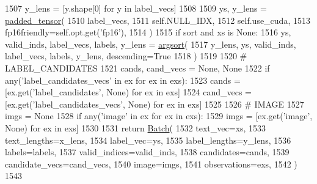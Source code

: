 \begin{DoxyCode}
1507             y\_lens = [y.shape[0] \textcolor{keywordflow}{for} y \textcolor{keywordflow}{in} label\_vecs]
1508 
1509             ys, y\_lens = \hyperlink{namespaceparlai_1_1agents_1_1legacy__agents_1_1seq2seq_1_1utils__v1_adb5a414ae439f14c54e8c760b91cc4c8}{padded\_tensor}(
1510                 label\_vecs,
1511                 self.NULL\_IDX,
1512                 self.use\_cuda,
1513                 fp16friendly=self.opt.get(\textcolor{stringliteral}{'fp16'}),
1514             )
1515             \textcolor{keywordflow}{if} sort \textcolor{keywordflow}{and} xs \textcolor{keywordflow}{is} \textcolor{keywordtype}{None}:
1516                 ys, valid\_inds, label\_vecs, labels, y\_lens = \hyperlink{namespaceparlai_1_1agents_1_1legacy__agents_1_1seq2seq_1_1utils__v1_a1521e559b740f741ebb47b8755202bb2}{argsort}(
1517                     y\_lens, ys, valid\_inds, label\_vecs, labels, y\_lens, descending=\textcolor{keyword}{True}
1518                 )
1519 
1520         \textcolor{comment}{# LABEL\_CANDIDATES}
1521         cands, cand\_vecs = \textcolor{keywordtype}{None}, \textcolor{keywordtype}{None}
1522         \textcolor{keywordflow}{if} any(\textcolor{stringliteral}{'label\_candidates\_vecs'} \textcolor{keywordflow}{in} ex \textcolor{keywordflow}{for} ex \textcolor{keywordflow}{in} exs):
1523             cands = [ex.get(\textcolor{stringliteral}{'label\_candidates'}, \textcolor{keywordtype}{None}) \textcolor{keywordflow}{for} ex \textcolor{keywordflow}{in} exs]
1524             cand\_vecs = [ex.get(\textcolor{stringliteral}{'label\_candidates\_vecs'}, \textcolor{keywordtype}{None}) \textcolor{keywordflow}{for} ex \textcolor{keywordflow}{in} exs]
1525 
1526         \textcolor{comment}{# IMAGE}
1527         imgs = \textcolor{keywordtype}{None}
1528         \textcolor{keywordflow}{if} any(\textcolor{stringliteral}{'image'} \textcolor{keywordflow}{in} ex \textcolor{keywordflow}{for} ex \textcolor{keywordflow}{in} exs):
1529             imgs = [ex.get(\textcolor{stringliteral}{'image'}, \textcolor{keywordtype}{None}) \textcolor{keywordflow}{for} ex \textcolor{keywordflow}{in} exs]
1530 
1531         \textcolor{keywordflow}{return} \hyperlink{namespaceparlai_1_1agents_1_1legacy__agents_1_1seq2seq_1_1torch__agent__v1_a74cfde390a2b9861179ac0fcd59da28c}{Batch}(
1532             text\_vec=xs,
1533             text\_lengths=x\_lens,
1534             label\_vec=ys,
1535             label\_lengths=y\_lens,
1536             labels=labels,
1537             valid\_indices=valid\_inds,
1538             candidates=cands,
1539             candidate\_vecs=cand\_vecs,
1540             image=imgs,
1541             observations=exs,
1542         )
1543 
\end{DoxyCode}
\mbox{\label{classparlai_1_1core_1_1torch__agent_1_1TorchAgent_a233316f9ec2805dd6a08fbf07f3a078a}} 
